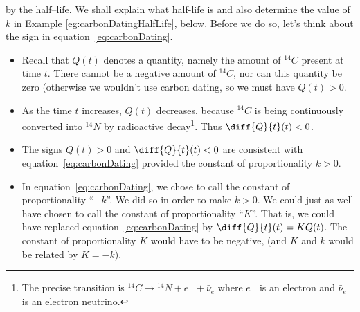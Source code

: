 by the half--life. We shall explain what half-life is and also determine
the value of $k$ in Example \ref{eg:carbonDatingHalfLife}, below. Before we do so, let's
think about the sign in equation~\eqref{eq:carbonDating}.
\begin{itemize}
 \item Recall that $Q(t)$ denotes  a quantity, namely the amount of ${}^{14}C$ present at
time $t$. There cannot be a negative amount of ${}^{14}C$, nor can this quantity be zero
(otherwise we wouldn't use carbon dating, so we must have $Q(t)> 0$.
\item As the time $t$ increases, $Q(t)$ decreases, because ${}^{14}C$ is being
continuously converted into ${}^{14}N$ by radioactive decay\footnote{
The precise transition is ${}^{14}C\rightarrow {}^{14}N+ e^- + \bar{\nu}_e$
where $e^-$ is an electron and $\bar{\nu}_e $ is an electron neutrino.}. Thus
$\diff{Q}{t}(t)< 0$.

\item The signs $Q(t)> 0$ and $\diff{Q}{t}(t)< 0$
are consistent with equation~\eqref{eq:carbonDating} provided the constant of
proportionality $k>0$.

\item In equation~\eqref{eq:carbonDating}, we chose to call the constant of
proportionality
``$-k$''. We did so in order to make $k>0$. We could just as well have chosen to
call the constant of proportionality ``$K$''.  That is, we could have replaced
equation~\eqref{eq:carbonDating} by $\diff{Q}{t}(t)=K Q(t)$. The constant of
proportionality $K$ would have to be negative, (and $K$ and $k$ would be
related by  $K=-k$).

\end{itemize}


